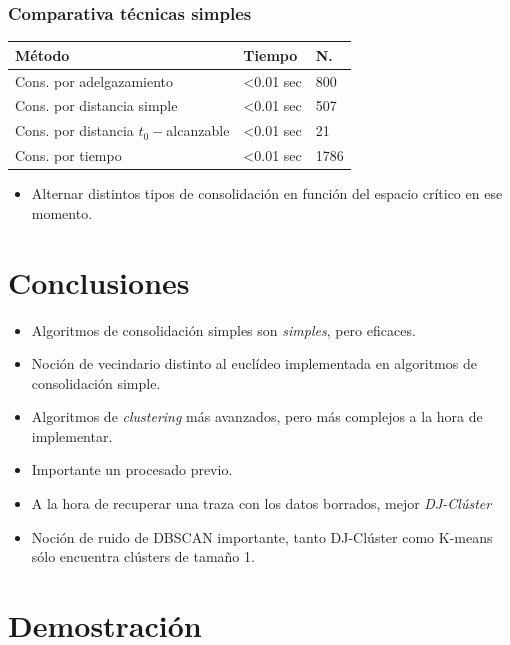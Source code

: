 \documentclass[10pt, spanish]{beamer}
\begin{document}
\begin{frame}[fragile]
\frametitle{Comparativa t\'ecnicas simples}

\begin{center}
\begin{tabular}{|l|l|l|}
	\hline
	\rowcolor{Gray}
	M\'etodo & Tiempo & N. \\
	\hline	
	Cons. por adelgazamiento &  <0.01 sec & 800 \\
	\hline 
	Cons. por distancia simple &  <0.01 sec & 507 \\
	\hline
	Cons. por distancia $t_0-$alcanzable  &  <0.01 sec  & 21\\
	\hline
	Cons. por tiempo &  <0.01 sec  & 1786\\
	\hline
\end{tabular}
\end{center}

\begin{itemize}
	\item Alternar distintos tipos de consolidaci\'on en funci\'on del espacio cr\'itico en ese momento.
\end{itemize}
\end{frame}

\section{Conclusiones}
\begin{frame}[fragile]
\begin{itemize}[<+- | alert@+>]
	\item Algoritmos de consolidaci\'on simples son \textit{simples}, pero eficaces.
	\item Noci\'on de vecindario distinto al eucl\'ideo implementada en algoritmos de consolidaci\'on simple.
	\item Algoritmos de \textit{clustering} m\'as avanzados, pero m\'as complejos a la hora de implementar.
	\item Importante un procesado previo.
	\item A la hora de recuperar una traza con los datos borrados, mejor \textit{DJ-Cl\'uster}
	\item Noci\'on de ruido de DBSCAN importante, tanto DJ-Cl\'uster como K-means s\'olo encuentra cl\'usters de tama\~no 1.
\end{itemize}
\end{frame}

\section{Demostraci\'on}
\end{document}

